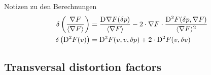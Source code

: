 Notizen zu den Berechnungen
\begin{subequations}
    \begin{align}
    \delta \left( \frac{ \nabla F  }{ \langle  \nabla F   \rangle } \right)  &=
    \frac{ \mathrm{D}^{  } \nabla F  ( \delta p ) }{ \langle  \nabla F   \rangle }  -
    2 \cdot \nabla F  \cdot \frac{ \mathrm{D}^{  2  } F ( \delta p, \nabla F  ) }{ \langle  \nabla F   \rangle^2 }
    \label{vvdgl}\\
    \delta\left( \mathrm{D}^{  2  } F ( v ) \right)  &=
    \mathrm{D}^{  3  } F ( v, v, \delta p )  +
    2 \cdot \mathrm{D}^{  2  } F ( v, \delta v )
    \end{align}
\end{subequations}


\subsection{Transversal distortion factors}


